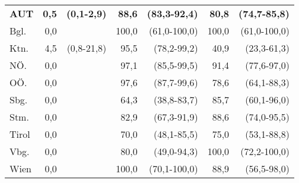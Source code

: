 \begin{table}[H]
\begin{tabular}{l|*{2}{rr|}rr}
	    \textbf{AUT} & \textbf{0,5} & \textbf{(0,1-2,9)} & \textbf{88,6} & \textbf{(83,3-92,4)} &  \textbf{80,8} &  \textbf{(74,7-85,8)} \\
        Bgl. & 0,0 &        & 100,0 & (61,0-100,0) &  100,0 & (61,0-100,0) \\
        Ktn. & 4,5 & (0,8-21,8) & 95,5 & (78,2-99,2) &  40,9 &  (23,3-61,3) \\
        NÖ. & 0,0 &       & 97,1 & (85,5-99,5) &  91,4 &  (77,6-97,0) \\
        OÖ. & 0,0 &       & 97,6 & (87,7-99,6) &  78,6 &  (64,1-88,3) \\
        Sbg. & 0,0 &         & 64,3 & (38,8-83,7) &  85,7 &  (60,1-96,0) \\
        Stm. & 0,0 &        & 82,9 & (67,3-91,9) &  88,6 &  (74,0-95,5) \\
        Tirol & 0,0 &        & 70,0 & (48,1-85,5) &  75,0 &  (53,1-88,8) \\
        Vbg. & 0,0 &         & 80,0 & (49,0-94,3) &  100,0 & (72,2-100,0) \\
        Wien & 0,0 &        & 100,0 & (70,1-100,0) &  88,9 &  (56,5-98,0) \\

        \bottomrule
    \end{tabular}

\end{table}